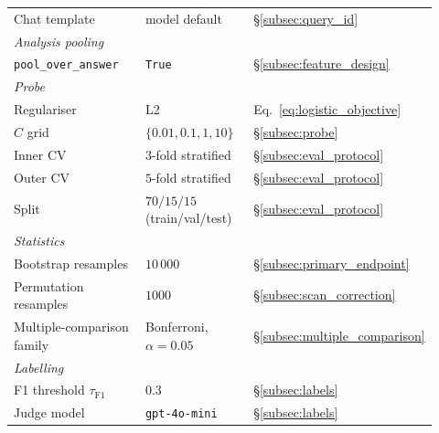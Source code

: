 \begin{table}[H]
\begin{tabular}{p{0.36\linewidth} p{0.28\linewidth} p{0.28\linewidth}}
        \hspace{1em}Chat template                & model default              & §\ref{subsec:query_id} \\
        \multicolumn{3}{l}{\emph{Analysis pooling}} \\
        \hspace{1em}\texttt{pool\_over\_answer}  & \texttt{True}              & §\ref{subsec:feature_design} \\
        \multicolumn{3}{l}{\emph{Probe}} \\
        \hspace{1em}Regulariser                  & L2                          & Eq.~\eqref{eq:logistic_objective} \\
        \hspace{1em}$C$ grid                     & $\{0.01, 0.1, 1, 10\}$     & §\ref{subsec:probe} \\
        \hspace{1em}Inner CV                     & $3$-fold stratified         & §\ref{subsec:eval_protocol} \\
        \hspace{1em}Outer CV                     & $5$-fold stratified         & §\ref{subsec:eval_protocol} \\
        \hspace{1em}Split                        & $70/15/15$ (train/val/test) & §\ref{subsec:eval_protocol} \\
        \multicolumn{3}{l}{\emph{Statistics}} \\
        \hspace{1em}Bootstrap resamples          & $10\,000$                   & §\ref{subsec:primary_endpoint} \\
        \hspace{1em}Permutation resamples        & $1000$                      & §\ref{subsec:scan_correction} \\
        \hspace{1em}Multiple-comparison family   & Bonferroni, $\alpha=0.05$  & §\ref{subsec:multiple_comparison} \\
        \multicolumn{3}{l}{\emph{Labelling}} \\
        \hspace{1em}F1 threshold $\tau_{\mathrm{F1}}$ & $0.3$                  & §\ref{subsec:labels} \\
        \hspace{1em}Judge model                  & \texttt{gpt-4o-mini}        & §\ref{subsec:labels} \\

\end{tabular}
\end{table}
